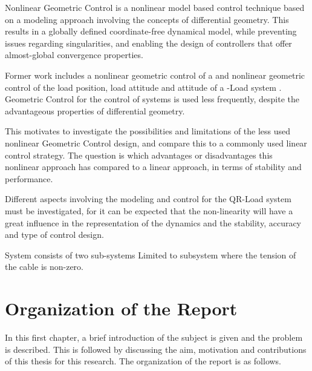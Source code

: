 Nonlinear Geometric Control is a nonlinear model based control technique based on a modeling approach involving the concepts of differential geometry. This results in a globally defined coordinate-free dynamical model, while preventing issues regarding singularities, and enabling the design of controllers that offer almost-global convergence properties.

Former work includes a nonlinear geometric control of a  \cite{Lee2010,Goodarzi2013a} and nonlinear geometric control of the load position, load attitude and  attitude of a -Load system \cite{Sreenath2013a,Sreenath2013b,Tang2014}.
Geometric Control for the control of  systems is used less frequently, despite the advantageous properties of differential geometry. 

This motivates to investigate the possibilities and limitations of the less used nonlinear Geometric Control design, and compare this to a commonly used linear control strategy.
The question is which advantages or disadvantages this nonlinear approach has compared to a linear approach, in terms of stability and performance.



Different aspects involving the modeling and control for the QR-Load system must be investigated, for it can be expected that the non-linearity will have a great influence in the representation of the dynamics and the stability, accuracy and type of control design.

System consists of two sub-systems
Limited to subsystem where the tension of the cable is non-zero. 

\section{Organization of the Report}

In this first chapter, a brief introduction of the subject is given and the problem is described. This is followed by discussing the aim, motivation and contributions of this thesis for this research. The organization of the report is as follows.


